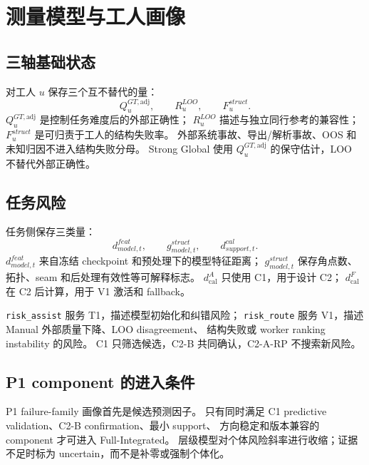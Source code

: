 \section{测量模型与工人画像}

\subsection{三轴基础状态}

对工人 $u$ 保存三个互不替代的量：
\[
Q^{GT,\mathrm{adj}}_u,\qquad R^{LOO}_u,\qquad F^{struct}_u.
\]
$Q^{GT,\mathrm{adj}}_u$ 是控制任务难度后的外部正确性；
$R^{LOO}_u$ 描述与独立同行参考的兼容性；
$F^{struct}_u$ 是可归责于工人的结构失败率。
外部系统事故、导出/解析事故、OOS 和未知归因不进入结构失败分母。
Strong Global 使用 $Q^{GT,\mathrm{adj}}_u$ 的保守估计，LOO 不替代外部正确性。

\subsection{任务风险}

任务侧保存三类量：
\[
d^{feat}_{model,t},\qquad g^{struct}_{model,t},\qquad d^{cal}_{support,t}.
\]
$d^{feat}_{model,t}$ 来自冻结 checkpoint 和预处理下的模型特征距离；
$g^{struct}_{model,t}$ 保存角点数、拓扑、seam 和后处理有效性等可解释标志。
$d_{\mathrm{cal}}^A$ 只使用 C1，用于设计 C2；
$d_{\mathrm{cal}}^F$ 在 C2 后计算，用于 V1 激活和 fallback。

\texttt{risk\_assist} 服务 T1，描述模型初始化和纠错风险；
\texttt{risk\_route} 服务 V1，描述 Manual 外部质量下降、LOO disagreement、
结构失败或 worker ranking instability 的风险。
C1 只筛选候选，C2-B 共同确认，C2-A-RP 不搜索新风险。

\subsection{P1 component 的进入条件}

P1 failure-family 画像首先是候选预测因子。
只有同时满足 C1 predictive validation、C2-B confirmation、最小 support、
方向稳定和版本兼容的 component 才可进入 Full-Integrated。
层级模型对个体风险斜率进行收缩；证据不足时标为 uncertain，而不是补零或强制个体化。

